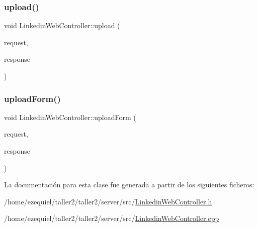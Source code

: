 \mbox{\label{classLinkedinWebController_a8cd6c4499d69595ddc6c349fa31c2c28}} 
\subsubsection{\texorpdfstring{upload()}{upload()}}
{\footnotesize\ttfamily void Linkedin\+Web\+Controller\+::upload (\begin{DoxyParamCaption}\item[{Mongoose\+::\+Request \&}]{request,  }\item[{Mongoose\+::\+Stream\+Response \&}]{response }\end{DoxyParamCaption})}

\mbox{\label{classLinkedinWebController_a380a3e6b865576901e066b82a7279460}} 
\subsubsection{\texorpdfstring{upload\+Form()}{uploadForm()}}
{\footnotesize\ttfamily void Linkedin\+Web\+Controller\+::upload\+Form (\begin{DoxyParamCaption}\item[{Mongoose\+::\+Request \&}]{request,  }\item[{Mongoose\+::\+Stream\+Response \&}]{response }\end{DoxyParamCaption})}



La documentación para esta clase fue generada a partir de los siguientes ficheros\+:\begin{DoxyCompactItemize}
\item 
/home/ezequiel/taller2/taller2/server/src/\hyperlink{LinkedinWebController_8h}{Linkedin\+Web\+Controller.\+h}\item 
/home/ezequiel/taller2/taller2/server/src/\hyperlink{LinkedinWebController_8cpp}{Linkedin\+Web\+Controller.\+cpp}\end{DoxyCompactItemize}
